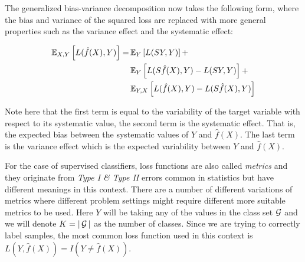 The generalized bias-variance decomposition now takes the following form, where the bias and variance of the squared loss are replaced with more general properties such as the variance effect and the systematic effect:

\begin{equation}
\begin{split}
\operatorname{\mathbb{E}}_{X,Y} \left[ L(\hat{f}(X),Y )\right] = & \operatorname{\mathbb{E}}_{Y} \left[ L(SY,Y )\right] + \\
 & \operatorname{\mathbb{E}}_{Y} \left[ L(S\hat{f}(X),Y ) - L(SY,Y )\right] + \\
 & \operatorname{\mathbb{E}}_{Y,X} \left[ L(\hat{f}(X),Y ) - L(S\hat{f}(X),Y )\right]
\end{split}
\end{equation}

Note here that the first term is equal to the variability of the target variable with respect to its systematic value, the second term is the systematic effect. That is, the expected bias between the systematic values of $Y$ and $\hat{f}(X)$. The last term is the variance effect which is the expected variability between $Y$ and $\hat{f}(X)$.





For the case of supervised classifiers, loss functions are also called \textit{metrics} and they originate from \textit{Type I \& Type II} errors common in statistics but have different meanings in this context. There are a number of different variations of metrics where different problem settings might require different more suitable metrics to be used. Here $Y$ will be taking any of the values in the class set $\operatorname{\mathcal{G}}$ and we will denote $K = |\operatorname{\mathcal{G}}|$ as the number of classes. Since we are trying to correctly label samples, the most common loss function used in this context is $L(Y, \hat{f}(X)) = I(Y \neq \hat{f}(X))$.

